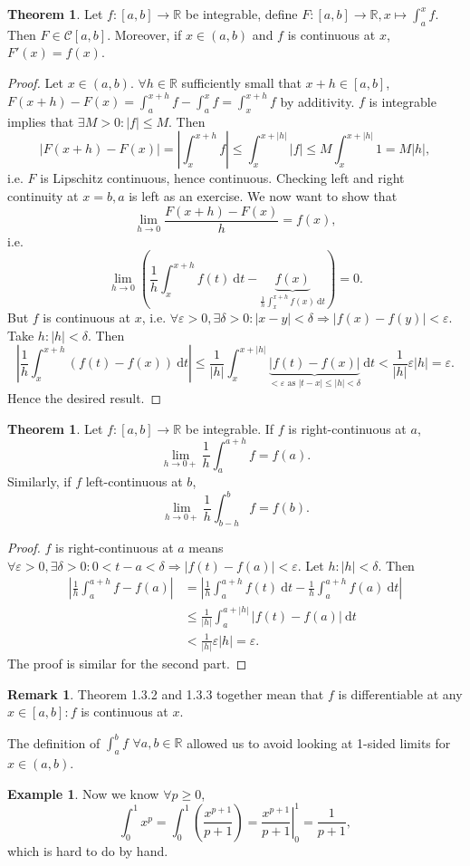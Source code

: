 \documentclass[a4paper]{article}
\theoremstyle{definition}
\newtheorem{thm}[defn]{Theorem}
\newtheorem{example}[defn]{Example}
\newtheorem*{remark}{Remark}
\begin{document}
\begin{thm}
Let $f:[a,b]\rightarrow \mathbb R$ be integrable, define $F:[a,b]\rightarrow \mathbb R, x\mapsto \int_a^x f$. Then $F\in \mathcal C [a,b]$. Moreover, if $x\in (a,b)$ and $f$ is continuous at $x$, $F'(x)=f(x)$.
\end{thm}
\begin{proof}
Let $x\in (a,b)$. $\forall h\in \mathbb R$ sufficiently small that $x+h\in [a,b]$, $F(x+h)-F(x)=\int_a^{x+h}f-\int_a^x f = \int_x^{x+h} f$ by additivity. $f$ is integrable implies that $\exists M>0: |f|\leq M$. Then
\[
|F(x+h)-F(x)|=\left|\int_x^{x+h}f\right|\leq \int_x^{x+|h|} |f|\leq M\int_x^{x+|h|}1=M|h|,
\]
i.e. $F$ is Lipschitz continuous, hence continuous. Checking left and right continuity at $x=b,a$ is left as an exercise. We now want to show that
\[
\lim_{h\rightarrow 0} \frac{F(x+h)-F(x)}{h}=f(x) ,
\]
i.e.
\[
\lim _{h\rightarrow 0} \left(\frac1h \int_x^{x+h}f(t) \ \mathrm d t - \underbrace{f(x)}_{\frac1h \int_x^{x+h}f(x) \ \mathrm d t}\right)=0 .
\]
But $f$ is continuous at $x$, i.e. $\forall \varepsilon >0, \exists \delta >0:|x-y|<\delta \Rightarrow |f(x)-f(y)|<\varepsilon$. Take $h:|h|<\delta$. Then
\[
\left|\frac{1}{h}\int_x^{x+h} \left(f(t)-f(x)\right) \ \mathrm d t \right|\leq \frac{1}{|h|} \int_x^{x+|h|} \underbrace{|f(t)-f(x)|}_{<\varepsilon \text{ as }|t-x|\leq |h|<\delta} \ \mathrm d t<\frac{1}{|h|}\varepsilon |h|=\varepsilon .
\]
Hence the desired result.
\end{proof}

\begin{thm}
Let $f:[a,b]\rightarrow \mathbb R$ be integrable. If $f$ is right-continuous at $a$,
\[
\lim_{h\rightarrow 0+} \frac1h \int_a^{a+h} f=f(a).
\]
Similarly, if $f$ left-continuous at $b$,
\[
\lim_{h\rightarrow 0+} \frac1h \int_{b-h}^b f=f(b).
\]
\end{thm}
\begin{proof}
$f$ is right-continuous at $a$ means $\forall \varepsilon >0, \exists \delta >0: 0<t-a<\delta \Rightarrow |f(t)-f(a)|<\varepsilon$. Let $h:|h|<\delta $. Then
\[
\begin{aligned}
    \left|\frac{1}{h}\int_a^{a+h}f-f(a) \right| &= \left|\frac{1}{h}\int_a^{a+h}f(t) \ \mathrm d t-\frac1h \int_a^{a+h} f(a) \ \mathrm d t \right| \\
    &\leq \frac{1}{|h|} \int_a^{a+|h|} |f(t)-f(a)| \ \mathrm d t \\
    &< \frac{1}{|h|}\varepsilon |h|=\varepsilon .
\end{aligned}
\]
The proof is similar for the second part.
\end{proof}
\begin{remark}
Theorem 1.3.2 and 1.3.3 together mean that $f$ is differentiable at any $x\in [a,b] : f$ is continuous at $x$.
\end{remark}
The definition of $\int_a^b f$ $\forall a,b\in \mathbb R$ allowed us to avoid looking at 1-sided limits for $x\in (a,b)$.
\begin{example}
Now we know $\forall p\geq 0$,
\[
\int_0^1 x^p = \int_0^1 \left( \frac{x^{p+1}}{p+1} \right)=\left. \frac{x^{p+1}}{p+1} \right|_0^1=\frac{1}{p+1},
\]
which is hard to do by hand.
\end{example}
\end{document}
